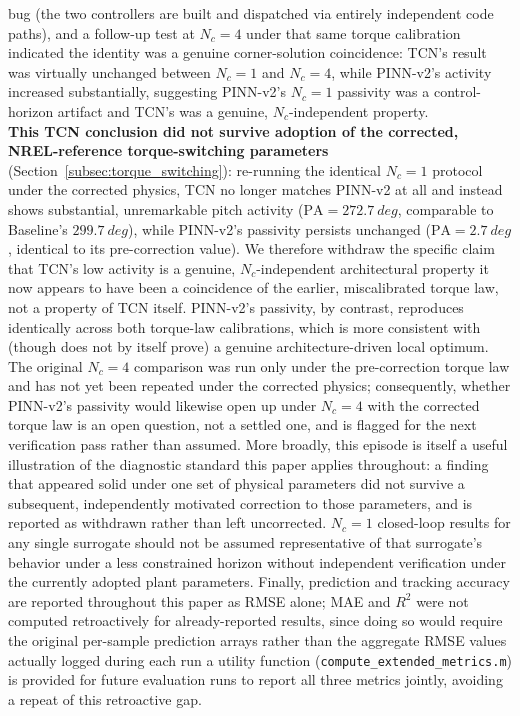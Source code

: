 bug (the two controllers are built and dispatched via entirely
independent code paths), and a follow-up test at $N_c=4$ under that same
torque calibration indicated the identity was a genuine corner-solution
coincidence: TCN's result was virtually unchanged between $N_c=1$ and
$N_c=4$, while PINN-v2's activity increased substantially, suggesting
PINN-v2's $N_c=1$ passivity was a control-horizon artifact and TCN's was
a genuine, $N_c$-independent property.\\ \textbf{This TCN conclusion did
not survive adoption of the corrected, NREL-reference torque-switching
parameters} (Section~\ref{subsec:torque_switching}): re-running the
identical $N_c=1$ protocol under the corrected physics, TCN no longer
matches PINN-v2 at all and instead shows substantial, unremarkable pitch
activity ($\text{PA}=\SI{272.7}{deg}$, comparable to Baseline's
$\SI{299.7}{deg}$), while PINN-v2's passivity persists unchanged
($\text{PA}=\SI{2.7}{deg}$, identical to its pre-correction value). We
therefore withdraw the specific claim that TCN's low activity is a
genuine, $N_c$-independent architectural property  it now appears to
have been a coincidence of the earlier, miscalibrated torque law, not a
property of TCN itself. PINN-v2's passivity, by contrast, reproduces
identically across both torque-law calibrations, which is more
consistent with (though does not by itself prove) a genuine
architecture-driven local optimum. The original $N_c=4$ comparison was
run only under the pre-correction torque law and has not yet been
repeated under the corrected physics; consequently, whether PINN-v2's
passivity would likewise open up under $N_c=4$ with the corrected
torque law is an open question, not a settled one, and is flagged for
the next verification pass rather than assumed. More broadly, this
episode is itself a useful illustration of the diagnostic standard this
paper applies throughout: a finding that appeared solid under one set of
physical parameters did not survive a subsequent, independently
motivated correction to those parameters, and is reported as withdrawn
rather than left uncorrected. $N_c=1$ closed-loop results for any single
surrogate should not be assumed representative of that surrogate's
behavior under a less constrained horizon without independent
verification under the currently adopted plant parameters. Finally, prediction and tracking accuracy
are reported throughout this paper as RMSE alone; MAE and $R^2$ were
not computed retroactively for already-reported results, since doing
so would require the original per-sample prediction arrays rather than
the aggregate RMSE values actually logged during each run  a
utility function (\texttt{compute\_extended\_metrics.m}) is provided
for future evaluation runs to report all three metrics jointly,
avoiding a repeat of this retroactive gap.

